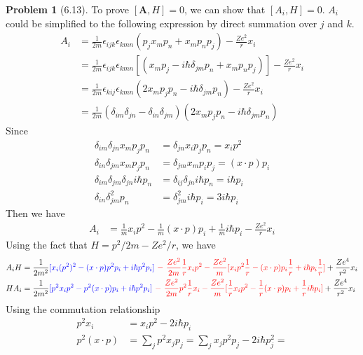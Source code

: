 \documentclass[twoside,11pt]{article}
\theoremstyle{definition}
\newtheorem{problem}{Problem}
\theoremstyle{remark}
\begin{document}
\begin{problem}[6.13]
To prove $[\mathbf{A}, H]=0$, we can show that $[A_i,H]=0$.
$A_i$ could be simplified to the following expression by direct summation
over $j$ and $k$.
\begin{align*}
    A_i &= \frac{1}{2m}\epsilon_{ijk}\epsilon_{kmn}
    (p_jx_mp_n+x_mp_np_j) - \frac{Ze^2}{r}x_i\\
    &= \frac{1}{2m}\epsilon_{ijk}\epsilon_{kmn}
    [(x_mp_j - i\hbar\delta_{jm}p_n + x_mp_np_j)] - \frac{Ze^2}{r}x_i\\
    &= \frac{1}{2m}\epsilon_{kij}\epsilon_{kmn}
    (2x_mp_jp_n - i\hbar\delta_{jm}p_n) - \frac{Ze^2}{r}x_i\\
    &= \frac{1}{2m}(\delta_{im}\delta_{jn} - \delta_{in}\delta_{jm})
    (2x_mp_jp_n - i\hbar\delta_{jm}p_n)
\end{align*}
Since
\begin{align*}
    \delta_{im}\delta_{jn}x_mp_jp_n &= \delta_{jn}x_ip_jp_n = x_ip^2\\
    \delta_{in}\delta_{jm}x_mp_jp_n &= \delta_{jm}x_mp_ip_j = (x\cdot p)p_i\\
    \delta_{im}\delta_{jm}\delta_{jn}i\hbar p_n&= 
    \delta_{ij}\delta_{jn}i\hbar p_n = i\hbar p_i\\
    \delta_{in}\delta_{jm}^2p_n &= \delta_{jm}^2 i\hbar p_i = 3i\hbar p_i
\end{align*}
Then we have 
\begin{align*}
    A_i &= \frac{1}{m}x_ip^2 - \frac{1}{m}(x\cdot p)p_i
    + \frac{1}{m}i\hbar p_i - \frac{Ze^2}{r}x_i
\end{align*}
Using the fact that $H=p^2/2m - Ze^2/r$, we have
\begin{align*}
    A_iH &=
    \frac{1}{2m^2}{\color{blue} [x_i(p^2)^2 - (x\cdot p) p^2p_i + i\hbar p^2p_i]
    }
    {\color{red}
    \ -\ \frac{Ze^2}{2m}\frac{1}{r}x_ip^2 - 
    \frac{Ze^2}{m}[x_ip^2\frac{1}{r} - (x\cdot p)p_i\frac{1}{r}
    +i\hbar p_i\frac{1}{r}]
    }
    + \frac{Ze^4}{r^2}x_i\\
    HA_i &= 
    \frac{1}{2m^2}{\color{blue}[p^2x_ip^2 - p^2(x\cdot p)p_i + i\hbar p^2p_i]
    }
    {\color{red} 
    \ -\ \frac{Ze^2}{2m}p^2\frac{1}{r}x_i 
     - \frac{Ze^2}{m}[\frac{1}{r}x_ip^2 - \frac{1}{r}(x\cdot p)p_i + 
    \frac{1}{r}i\hbar p_i]
    }
    + \frac{Ze^4}{r^2}x_i
\end{align*}
Using the commutation relationship
\begin{align*}
    p^2 x_i &= x_ip^2 - 2i\hbar p_i\\
    p^2(x\cdot p) &= \sum_j p^2x_jp_j 
    = \sum_j x_jp^2p_j - 2i\hbar p_j^2= 

\end{align*}
\end{problem}
\end{document}
